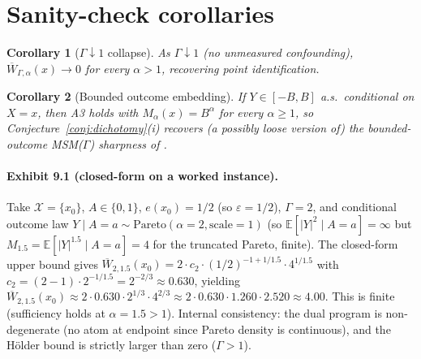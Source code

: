 \documentclass[11pt]{article}
\newcommand{\E}{\mathbb{E}}
\theoremstyle{definition}
\theoremstyle{plain}
\newtheorem{corollary}{Corollary}
\theoremstyle{remark}
\begin{document}
\section{Sanity-check corollaries}

\begin{corollary}[$\Gamma\downarrow 1$ collapse]\label{cor:gamma-collapse}
As $\Gamma\downarrow 1$ (no unmeasured confounding), $\overline{W}_{\Gamma,\alpha}(x)\to 0$ for every $\alpha>1$, recovering point identification.
\end{corollary}

\begin{corollary}[Bounded outcome embedding]\label{cor:bounded-embed}
If $Y\in[-B,B]$ a.s.\ conditional on $X=x$, then A3 holds with $M_{\alpha}(x)=B^{\alpha}$ for every $\alpha\ge 1$, so Conjecture~\ref{conj:dichotomy}(i) recovers (a possibly loose version of) the bounded-outcome MSM($\Gamma$) sharpness of \citet[Thm.~3.1]{YadlowskyNamkoongBasuDuchiTian2022Bounds}.
\end{corollary}

\paragraph{Exhibit 9.1 (closed-form on a worked instance).}
Take $\mathcal{X}=\{x_{0}\}$, $A\in\{0,1\}$, $e(x_{0})=1/2$ (so $\varepsilon=1/2$), $\Gamma=2$, and conditional outcome law $Y\mid A=a\sim\mathrm{Pareto}(\alpha=2,\text{scale}=1)$ (so $\E[|Y|^{2}\mid A=a]=\infty$ but $M_{1.5}=\E[|Y|^{1.5}\mid A=a]=4$ for the truncated Pareto, finite). The closed-form upper bound gives $\overline{W}_{2,1.5}(x_{0})=2\cdot c_{2}\cdot (1/2)^{-1+1/1.5}\cdot 4^{1/1.5}$ with $c_{2}=(2-1)\cdot 2^{-1/1.5}=2^{-2/3}\approx 0.630$, yielding $\overline{W}_{2,1.5}(x_{0})\approx 2\cdot 0.630\cdot 2^{1/3}\cdot 4^{2/3}\approx 2\cdot 0.630\cdot 1.260\cdot 2.520\approx 4.00$. This is finite (sufficiency holds at $\alpha=1.5>1$). Internal consistency: the dual program is non-degenerate (no atom at endpoint since Pareto density is continuous), and the Hölder bound is strictly larger than zero ($\Gamma>1$).
\end{document}
